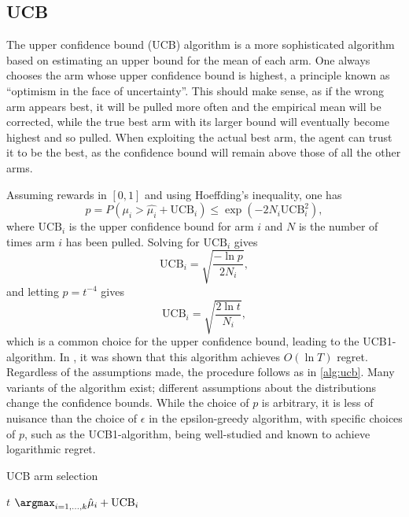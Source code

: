 \subsection{UCB}
The upper confidence bound (UCB) algorithm is a more sophisticated algorithm based on estimating an upper bound for the mean of each arm.
One always chooses the arm whose upper confidence bound is highest, a principle known as \enquote{optimism in the face of uncertainty}.
This should make sense, as if the wrong arm appears best, it will be pulled more often and the empirical mean will be corrected, while the true best arm with its larger bound will eventually become highest and so pulled.
When exploiting the actual best arm, the agent can trust it to be the best, as the confidence bound will remain above those of all the other arms.

Assuming rewards in $[0,1]$ and using Hoeffding's inequality, one has
\begin{equation}
    p
    = P \left(\mu_i > \hat{\mu_i} + \text{UCB}_i \right)
    \leq \exp \left(-2N_i \text{UCB}_i^2 \right),
\end{equation}
where $\text{UCB}_i$ is the upper confidence bound for arm $i$ and $N$ is the number of times arm $i$ has been pulled.
Solving for $\text{UCB}_i$ gives
\begin{equation}
    \text{UCB}_i = \sqrt{\frac{-\ln p}{2N_i}},
\end{equation}
and letting $p = t^{-4}$ gives
\begin{equation}
    \text{UCB}_i = \sqrt{\frac{2 \ln t}{N_i}},
\end{equation}
which is a common choice for the upper confidence bound, leading to the UCB1-algorithm.
In \cite{auer2002}, it was shown that this algorithm achieves $O(\ln T)$ regret.
Regardless of the assumptions made, the procedure follows as in \cref{alg:ucb}.
Many variants of the algorithm exist; different assumptions about the distributions change the confidence bounds.
While the choice of $p$ is arbitrary, it is less of nuisance than the choice of $\epsilon$ in the epsilon-greedy algorithm, with specific choices of $p$, such as the UCB1-algorithm, being well-studied and known to achieve logarithmic regret.

\begin{algorithm}
    \caption{UCB arm selection}
    \label{alg:ucb}
    \begin{algorithmic}
        \State \Return $t$
        \Else
        \State \Return $\argmax_{i=1,\dots,k} \hat{\mu}_i + \text{UCB}_i$
        \EndIf
    \end{algorithmic}
\end{algorithm}


